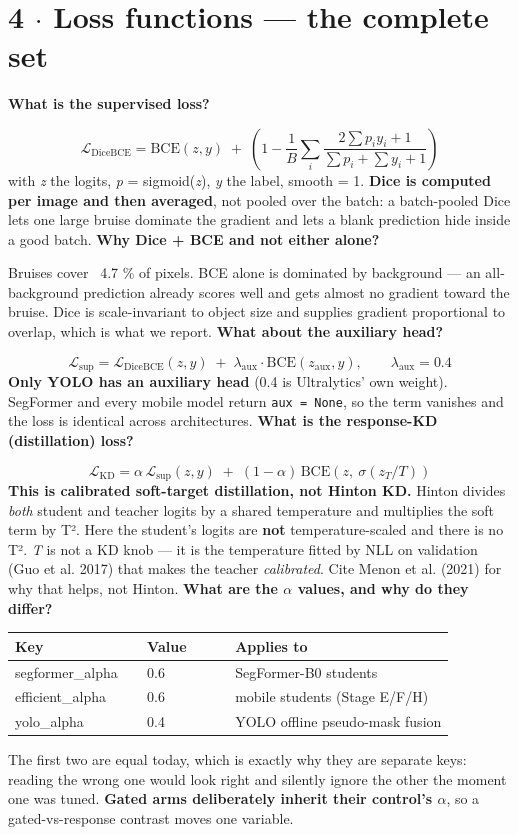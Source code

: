 \documentclass[10pt,a4paper]{article}
\newcommand{\qq}[1]{\medskip\noindent\textbf{\color{navy}#1}\par\nobreak}
\begin{document}
\section*{4 $\cdot$ Loss functions — the complete set}
\qq{What is the supervised loss?}
\[\mathcal{L}_{\mathrm{DiceBCE}} = \mathrm{BCE}(z, y) \;+\; \left(1 - \frac{1}{B}\sum_{i}\frac{2\sum p_i y_i + 1}{\sum p_i + \sum y_i + 1}\right)\]
with \textit{z} the logits, \textit{p} = sigmoid(\textit{z}), \textit{y} the label, smooth = 1. \textbf{Dice is computed per image and then averaged}, not pooled over the batch: a batch-pooled Dice lets one large bruise dominate the gradient and lets a blank prediction hide inside a good batch.
\qq{Why Dice + BCE and not either alone?}
Bruises cover ~4.7 \% of pixels. BCE alone is dominated by background — an all-background prediction already scores well and gets almost no gradient toward the bruise. Dice is scale-invariant to object size and supplies gradient proportional to overlap, which is what we report.
\qq{What about the auxiliary head?}
\[\mathcal{L}_{\mathrm{sup}} = \mathcal{L}_{\mathrm{DiceBCE}}(z,y) \;+\; \lambda_{\mathrm{aux}}\cdot \mathrm{BCE}(z_{\mathrm{aux}}, y),\qquad \lambda_{\mathrm{aux}} = 0.4\]
\textbf{Only YOLO has an auxiliary head} (0.4 is Ultralytics' own weight). SegFormer and every mobile model return \texttt{aux = None}, so the term vanishes and the loss is identical across architectures.
\qq{What is the response-KD (distillation) loss?}
\[\mathcal{L}_{\mathrm{KD}} = \alpha\,\mathcal{L}_{\mathrm{sup}}(z, y) \;+\; (1-\alpha)\,\mathrm{BCE}\left(z,\ \sigma(z_T / T)\right)\]
\textbf{This is calibrated soft-target distillation, not Hinton KD.} Hinton divides \textit{both} student and teacher logits by a shared temperature and multiplies the soft term by T². Here the student's logits are \textbf{not} temperature-scaled and there is no T². \textit{T} is not a KD knob — it is the temperature fitted by NLL on validation (Guo et al. 2017) that makes the teacher \textit{calibrated}. Cite Menon et al. (2021) for why that helps, not Hinton.
\qq{What are the $\alpha$ values, and why do they differ?}
\begin{center}\small\begin{tabular}{p{0.3\linewidth}p{0.2\linewidth}p{0.5\linewidth}}
\toprule
\textbf{Key} & \textbf{Value} & \textbf{Applies to} \\
\midrule
segformer_alpha & 0.6 & SegFormer-B0 students \\
efficient_alpha & 0.6 & mobile students (Stage E/F/H) \\
yolo_alpha & 0.4 & YOLO offline pseudo-mask fusion \\
\bottomrule\end{tabular}\end{center}
The first two are equal today, which is exactly why they are separate keys: reading the wrong one would look right and silently ignore the other the moment one was tuned. \textbf{Gated arms deliberately inherit their control's $\alpha$}, so a gated-vs-response contrast moves one variable.
\end{document}
